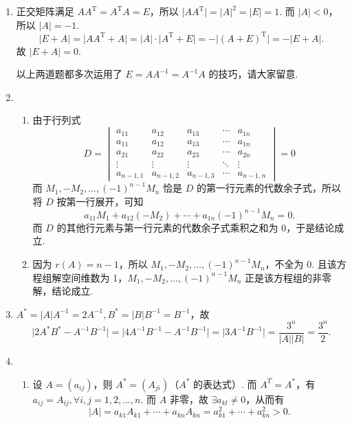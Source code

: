 \begin{enumerate}
    \item 正交矩阵满足 $AA^{\mathrm{T}} = A^{\mathrm{T}}A = E$，所以 $\lvert AA^{\mathrm{T}} \rvert = \lvert A \rvert^2 = \lvert E \rvert = 1$. 而 $\lvert A \rvert < 0$，所以 $\lvert A \rvert = -1$.
          \[\lvert E+A \rvert = \lvert AA^{\mathrm{T}}+A \rvert = \lvert A \rvert \cdot \lvert A^{\mathrm{T}}+E \rvert = -\lvert (A+E)^{\mathrm{T}} \rvert = -\lvert E+A \rvert.\]
          故 $\lvert E+A \rvert = 0$.

          以上两道题都多次运用了 $E = AA^{-1} = A^{-1}A$ 的技巧，请大家留意.

    \item \begin{enumerate}
              \item 由于行列式
                    \[ D = \begin{vmatrix}
                            a_{11}     & a_{12}     & a_{13}     & \cdots & a_{1n}     \\
                            a_{11}     & a_{12}     & a_{13}     & \cdots & a_{1n}     \\
                            a_{21}     & a_{22}     & a_{23}     & \cdots & a_{2n}     \\
                            \vdots     & \vdots     & \vdots     & \ddots & \vdots     \\
                            a_{n-1, 1} & a_{n-1, 2} & a_{n-1, 3} & \cdots & a_{n-1, n}
                        \end{vmatrix} = 0\]
                    而 $M_1, -M_2, \ldots, (-1)^{n-1}M_n$ 恰是 $D$ 的第一行元素的代数余子式，所以将 $D$ 按第一行展开，可知\[a_{11}M_1+a_{12}(-M_2)+\cdots+a_{1n}(-1)^{n-1}M_n=0.\]
                    而 $D$ 的其他行元素与第一行元素的代数余子式乘积之和为 0，于是结论成立.

              \item 因为 $r(A) = n-1$，所以 $M_1, -M_2, \ldots, (-1)^{n-1}M_n$，不全为 0. 且该方程组解空间维数为 1，$M_1, -M_2, \ldots, (-1)^{n-1}M_n$ 正是该方程组的非零解，结论成立.
          \end{enumerate}

    \item $A^* = \lvert A \rvert A^{-1} = 2A^{-1}, B^* = \lvert B \rvert B^{-1} = B^{-1}$，故 \[\lvert 2A^*B^*-A^{-1}B^{-1} \rvert = \lvert 4A^{-1}B^{-1}-A^{-1}B^{-1} \rvert = \lvert 3A^{-1}B^{-1} \rvert = \dfrac{3^n}{\lvert A \rvert \lvert B \rvert} = \dfrac{3^n}{2}.\]

    \item \begin{enumerate}
              \item 设 $A = (a_{ij})$，则 $A^* = (A_{ji})$（$A^*$ 的表达式）. 而 $A^T = A^*$，有 $a_{ij} = A_{ij}, \forall i, j = 1, 2, \ldots, n$. 而 $A$ 非零，故 $\exists a_{kl} \neq 0$，从而有 \[ \lvert A \rvert = a_{k1}A_{k1}+\cdots+a_{kn}A_{kn} = a_{k1}^2+\cdots+a_{kn}^2 > 0.\]


\end{enumerate}
\end{enumerate}
